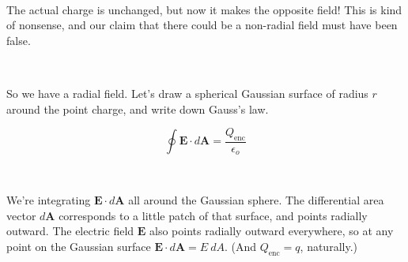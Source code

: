 \documentclass{article}
\numberwithin{equation}{section}
\newcommand{\bunny}[1][]{
    \tikz \fill [scale=1ex/500,yscale=1,#1] svg "M3831 8683 c-70 -71 -235 -358 -326 -567 -168 -385 -252 -748 -275 -1181 -5 -104 -9 -199 -7 -209 2 -16 -10 -21 -88 -36 -158 -31 -407 -112 -530 -173 -117 -58 -239 -150 -365 -277 -178 -177 -305 -366 -407 -604 -44 -102 -55 -118 -136 -201 -110 -113 -148 -183 -154 -288 -4 -53 0 -88 14 -132 12 -37 16 -70 12 -85 -4 -14 -7 -62 -8 -107 -3 -225 125 -386 369 -461 66 -20 157 -35 282 -47 l68 -7 -25 -47 c-41 -81 -59 -197 -52 -341 10 -200 66 -413 174 -660 153 -347 352 -632 640 -914 l104 -102 9 -95 c13 -131 12 -378 -1 -441 -25 -115 -92 -205 -180 -242 -138 -58 -168 -77 -220 -139 -92 -109 -110 -180 -63 -237 63 -75 165 -100 429 -107 159 -4 215 -2 275 11 267 57 455 273 539 619 20 84 29 107 41 103 8 -3 89 -37 179 -76 197 -86 466 -177 651 -220 74 -18 142 -34 150 -37 8 -3 -14 -15 -50 -28 -257 -88 -340 -205 -227 -319 48 -47 82 -58 257 -78 225 -26 1652 -9 1850 23 75 12 154 51 184 92 22 30 23 43 15 268 -3 65 0 83 25 133 50 102 131 161 255 187 46 9 67 8 150 -11 230 -54 428 -7 556 131 71 77 99 149 92 240 -7 115 -65 203 -185 282 -218 145 -282 308 -264 665 30 563 -100 1035 -383 1397 -78 99 -236 254 -335 327 -319 238 -731 392 -1245 468 -301 44 -438 49 -1090 37 -69 -2 -107 3 -160 20 l-70 22 3 238 c3 183 0 265 -12 356 -18 123 -53 275 -81 340 -16 38 -16 40 9 70 456 567 686 1088 725 1647 21 289 -41 691 -116 749 -28 23 -72 27 -106 10 -63 -31 -322 -342 -452 -541 -38 -59 -73 -108 -77 -108 -5 0 -8 11 -8 24 0 14 -9 74 -21 133 -44 228 -158 517 -217 547 -50 26 -80 20 -121 -21z";
}
\begin{document}
\begin{minipage}{0.5\textwidth}
\begin{flushleft}
\begin{figure}[H]
\label{fig:2:c}
\end{figure}
\end{flushleft}
\end{minipage}
~
\begin{minipage}{0.5\textwidth}
\begin{flushright}
\parbox[c]{\textwidth}{The actual charge is unchanged, but now it makes the opposite field! This is kind of nonsense, and our claim that there could be a non-radial field must have been false.}
\end{flushright}
\end{minipage}

\begin{minipage}{0.5\textwidth}
\begin{flushleft}
\begin{figure}[H]
\label{fig:2:d}
\end{figure}
\end{flushleft}
\end{minipage}
~
\begin{minipage}{0.5\textwidth}
\begin{flushright}
\parbox[c]{\textwidth}{So we have a radial field. Let's draw a spherical Gaussian surface of radius $r$ around the point charge, and write down Gauss's law.}
\end{flushright}
\end{minipage}

\begin{minipage}{0.5\textwidth}
\begin{flushleft}
\begin{equation*}
    \oint \bm{E} \cdot d\bm{A} = \frac{Q_{\text{enc}}}{\epsilon_o}
\end{equation*}
\end{flushleft}
\end{minipage}
~
\begin{minipage}{0.5\textwidth}
\begin{flushright}
\parbox[c]{\textwidth}{We're integrating $\bm{E} \cdot d\bm{A}$ all around the Gaussian sphere. The differential area vector $d\bm{A}$ corresponds to a little patch of that surface, and points radially outward. The electric field $\bm{E}$ also points radially outward everywhere, so at any point on the Gaussian surface $\bm{E} \cdot d\bm{A} = E\ dA$. (And $Q_{\text{enc}} = q$, naturally.)}
\end{flushright}
\end{minipage}
\end{document}
